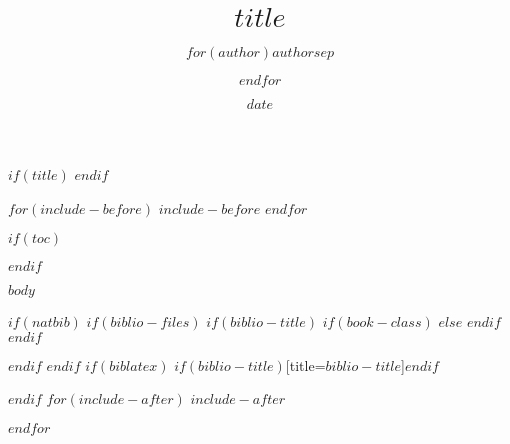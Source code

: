 \documentclass[UTF8]{ctexbeamer}
\title{$title$}
\author{$for(author)$$author$$sep$ \and $endfor$}
\date{$date$}
\begin{document}
$if(title)$
\frame{\titlepage}
$endif$

$for(include-before)$
$include-before$
$endfor$

$if(toc)$
\begin{frame}
\tableofcontents[hideallsubsections]
\end{frame}
$endif$

$body$

$if(natbib)$
$if(biblio-files)$
$if(biblio-title)$
$if(book-class)$
\renewcommand\bibname{$biblio-title$}
$else$
\renewcommand\refname{$biblio-title$}
$endif$
$endif$


$endif$
$endif$
$if(biblatex)$
\printbibliography$if(biblio-title)$[title=$biblio-title$]$endif$

$endif$
$for(include-after)$
$include-after$

$endfor$
\end{document}
